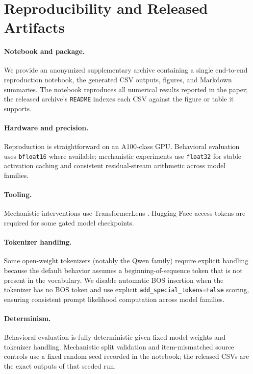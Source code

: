 \documentclass[11pt]{article}
\begin{document}
\FloatBarrier
\section{Reproducibility and Released Artifacts}
\label{app:reproducibility}

\paragraph{Notebook and package.}
We provide an anonymized supplementary archive containing a single end-to-end reproduction
notebook, the generated CSV outputs, figures, and Markdown summaries. The notebook reproduces
all numerical results reported in the paper; the released archive's \texttt{README} indexes
each CSV against the figure or table it supports.

\paragraph{Hardware and precision.}
Reproduction is straightforward on an A100-class GPU. Behavioral evaluation uses
\texttt{bfloat16} where available; mechanistic experiments use \texttt{float32} for stable
activation caching and consistent residual-stream arithmetic across model families.

\paragraph{Tooling.}
Mechanistic interventions use TransformerLens \citep{nanda2022transformerlens}.
Hugging Face access tokens are required for some gated model checkpoints.

\paragraph{Tokenizer handling.}
Some open-weight tokenizers (notably the Qwen family) require explicit handling because the
default behavior assumes a beginning-of-sequence token that is not present in the vocabulary.
We disable automatic BOS insertion when the tokenizer has no BOS token and use explicit
\texttt{add\_special\_tokens=False} scoring, ensuring consistent prompt likelihood computation
across model families.

\paragraph{Determinism.}
Behavioral evaluation is fully deterministic given fixed model weights and tokenizer handling.
Mechanistic split validation and item-mismatched source controls use a fixed random seed
recorded in the notebook; the released CSVs are the exact outputs of that seeded run.
\end{document}
